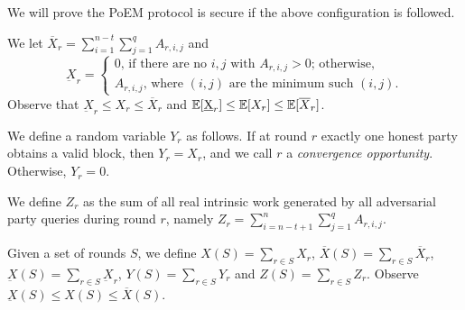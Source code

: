 We will prove the PoEM protocol is secure if the above configuration is
followed.

We let $\overline{X}_r = \sum_{i = 1}^{n - t} \sum_{j = 1}^q A_{r,i,j}$ and
\[
  \underbar{X}_r = \begin{cases}
  0 \text{, if there are no $i, j$ with $A_{r,i,j} > 0$; otherwise,}\\
  A_{r,i,j} \text{, where $(i, j)$ are the minimum such $(i, j)$.}
\end{cases}\]
Observe that $\underbar{X}_r \leq X_r \leq \overline{X}_r$
and $\mathop{{}\mathbb{E}}[\underbar{X}_r] \leq \mathop{{}\mathbb{E}}[X_r] \leq \mathop{{}\mathbb{E}}[\overline{X}_r]$.

We define a random variable $Y_r$ as follows.
If at round $r$ exactly one honest party obtains a valid block, then $Y_r = X_r$,
and we call $r$ a \emph{convergence opportunity}. Otherwise, $Y_r = 0$.

We define $Z_{r}$ as the sum of all real intrinsic work generated by all adversarial
party queries during round $r$, namely $Z_{r} = \sum_{i = n - t + 1}^n \sum_{j = 1}^q A_{r, i, j}$.

Given a set of rounds $S$, we define
$X(S) = \sum_{r \in S} X_r$,
$\overline{X}(S) = \sum_{r \in S} \overline{X}_r$,
$\underbar{X}(S) = \sum_{r \in S} \underbar{X}_r$,
$Y(S) = \sum_{r \in S} Y_r$
and $Z(S) = \sum_{r \in S} Z_r$.
Observe $\underbar{X}(S) \leq X(S) \leq \overline{X}(S)$.

